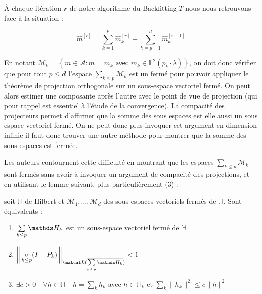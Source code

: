 {    \noindent À chaque itération $r$ de notre algorithme du Backfitting $T$ nous nous retrouvons face à la situation : 
    
    \begin{equation*}
        \widehat m^{[r]} = \sum_{k=1}^p \widehat m_k^{[r]} + \sum_{k=p+1}^d \widehat m_k^{[r-1]}
    \end{equation*}

    \noindent En notant $\mathcal M_k = \left\{ m \in \mathcal A : m = m_k \textsf{ avec } m_k \in \mathds L^2(p_k \cdot \lambda) \right\}$, on doit donc vérifier que pour tout $p \leq d$ l'espace $\sum_{k\leq p} \mathcal M_k$ est un fermé pour pouvoir appliquer le théorème de projection orthogonale sur un sous-espace vectoriel fermé. On peut alors estimer une composante après l'autre avec le point de vue de projection (qui pour rappel est essentiel à l'étude de la convergence). La compacité des projecteurs permet d'affirmer que la somme des sous espaces est elle aussi un sous espace vectoriel fermé. On ne peut donc plus invoquer cet argument en dimension infinie il faut donc trouver une autre méthode pour montrer que la somme des sous espaces est fermée.

    \bigskip

    \noindent Les auteurs contournent cette difficulté en montrant que les espaces $\sum_{k\leq p} \mathcal M_k$ sont fermés sans avoir à invoquer un argument de compacité des projections, et en utilisant le lemme suivant, plus particulièrement (3) :

    \begin{lem*}
        soit $\mathds H$ de Hilbert et $\mathcal M_1, \dots, \mathcal M_d$ des sous-espaces vectoriels fermés de $\mathds H$.
        Sont équivalents :
        \begin{enumerate}
            \item $\sum\limits_{k\leq p} \mathcal \mathds H_k$ est un sous-espace vectoriel fermé de $\mathds H$
            \item $\displaystyle\norme{\matcal L( \overline{\sum\limits_{k\leq p} \mathcal \mathds H_k})} {\underset{k\leq p}\circ(I-P_k)} < 1$
            \item $\exists c > 0 \quad \forall h \in \mathds H \quad h = \sum_k h_k$ avec $h \in \mathds H_k$ et $\sum_k \lVert h_k \rVert^2 \leq c \lVert h \rVert^2$
        \end{enumerate}
    \end{lem*}




}